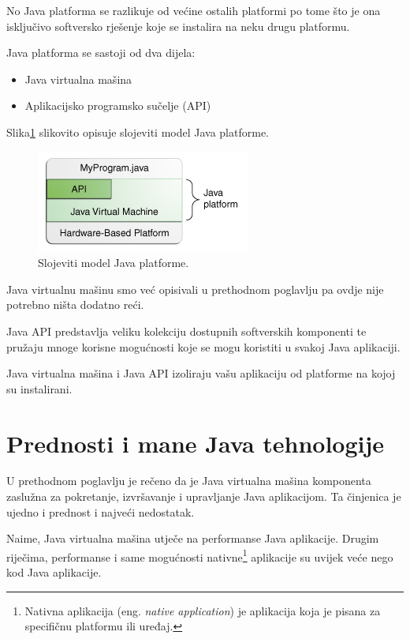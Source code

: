 No Java platforma se razlikuje od većine ostalih platformi po tome što je ona isključivo softversko rješenje koje se instalira na neku drugu platformu.

Java platforma se sastoji od dva dijela:

\begin{itemize}
    \item Java virtualna mašina
    \item Aplikacijsko programsko sučelje (API)
\end{itemize}

Slika\ref{fig:java-platform-layer-model} slikovito opisuje slojeviti model Java platforme.~\cite{javatutorials}

\begin{figure}[h!]
    \label{fig:java-platform-layer-model}
    \caption{Slojeviti model Java platforme.}
    \centering
    \includegraphics[scale=0.6]{images/java-platform-layer-model.png}
\end{figure}

Java virtualnu mašinu smo već opisivali u prethodnom poglavlju pa ovdje nije potrebno ništa dodatno reći.

Java API predstavlja veliku kolekciju dostupnih softverskih komponenti te pružaju mnoge korisne mogućnosti koje se mogu koristiti u svakoj Java aplikaciji.

\begin{infobox}
    Java virtualna mašina i Java API izoliraju vašu aplikaciju od platforme na kojoj su instalirani.
\end{infobox}

\section{Prednosti i mane Java tehnologije}
U prethodnom poglavlju je rečeno da je Java virtualna mašina komponenta zaslužna za pokretanje, izvršavanje i upravljanje Java aplikacijom. Ta činjenica je ujedno i prednost i najveći nedostatak.

Naime, Java virtualna mašina utječe na performanse Java aplikacije. Drugim riječima, performanse i same mogućnosti nativne\footnote{Nativna aplikacija (eng. \emph{native application}) je aplikacija koja je pisana za specifičnu platformu ili uređaj.} aplikacije su uvijek veće nego kod Java aplikacije.

